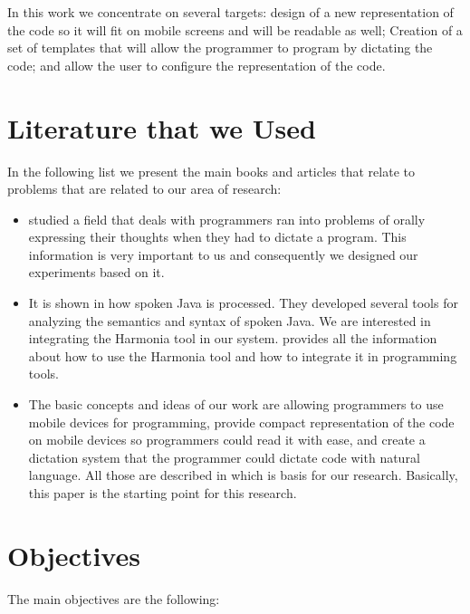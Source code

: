 In this work we concentrate on several targets: design of a new representation of the code so it will fit on mobile screens and will be readable as well; Creation of a set of templates that will allow the programmer to program by dictating the code; and allow the user to configure the representation of the code.

\section{Literature that we Used}
In the following list we present the main books and articles that relate to problems that are related to our area of research:

\begin{itemize}
	\item \citet[Chap. 2]{andrew11} studied a field that deals with programmers ran into problems of orally expressing their thoughts when they had to dictate a program. This information is very important to us and consequently we designed our experiments based on it.
	\item It is shown in \citet[Chap. 3]{andrew11} how spoken Java is processed. They developed several tools for analyzing the semantics and syntax of spoken Java. We are interested in integrating the Harmonia tool \cite{harmonia} in our system. \cite{harmonia} provides all the information about how to use the Harmonia tool and how to integrate it in programming tools.
	\item The basic concepts and ideas of our work are allowing programmers to use mobile devices for programming, provide compact representation of the code on mobile devices so programmers could read it with ease, and create a dictation system that the programmer could dictate code with natural language. All those are described in \citet[Programming By Voice and Touch]{yishai13} which is basis for our research. Basically, this paper is the starting point for this research.
\end{itemize}

\section{Objectives}
The main objectives are the following:

